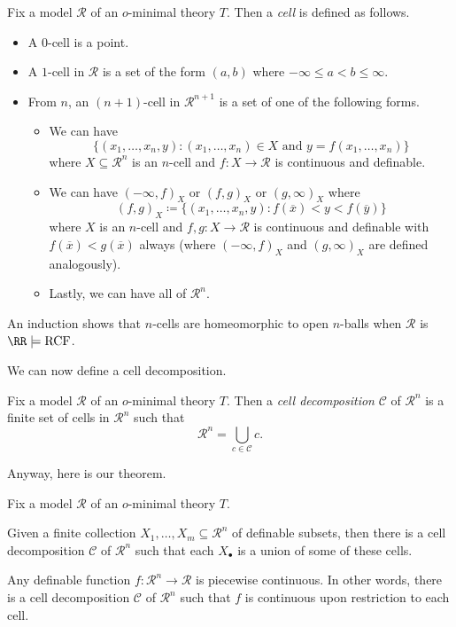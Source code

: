 \documentclass[../notes.tex]{subfiles}
\begin{document}
\begin{definition}[cell]
	Fix a model $\mathcal R$ of an $o$-minimal theory $T$. Then a \textit{cell} is defined as follows.
	\begin{itemize}
		\item A $0$-cell is a point.
		\item A $1$-cell in $\mathcal R$ is a set of the form $(a,b)$ where $-\infty\le a<b\le\infty$.
		\item From $n$, an $(n+1)$-cell in $\mathcal R^{n+1}$ is a set of one of the following forms.
		\begin{itemize}
			\item We can have
			\[\{(x_1,\ldots,x_n,y):(x_1,\ldots,x_n)\in X\text{ and }y=f(x_1,\ldots,x_n)\}\]
			where $X\subseteq\mathcal R^n$ is an $n$-cell and $f\colon X\to\mathcal R$ is continuous and definable.
			\item We can have $(-\infty,f)_X$ or $(f,g)_X$ or $(g,\infty)_X$ where
			\[(f,g)_X\coloneqq\{(x_1,\ldots,x_n,y):f(\overline x)<y<f(\overline y)\}\]
			where $X$ is an $n$-cell and $f,g\colon X\to\mathcal R$ is continuous and definable with $f(\overline x)<g(\overline x)$ always (where $(-\infty,f)_X$ and $(g,\infty)_X$ are defined analogously).
			\item Lastly, we can have all of $\mathcal R^n$.
		\end{itemize}
	\end{itemize}
\end{definition}
\begin{remark}
	An induction shows that $n$-cells are homeomorphic to open $n$-balls when $\mathcal R$ is $\RR\models\mathrm{RCF}$.
\end{remark}
We can now define a cell decomposition.
\begin{definition}
	Fix a model $\mathcal R$ of an $o$-minimal theory $T$. Then a \textit{cell decomposition} $\mathcal C$ of $\mathcal R^n$ is a finite set of cells in $\mathcal R^n$ such that
	\[\mathcal R^n=\bigcup_{c\in\mathcal C}c.\]
\end{definition}
Anyway, here is our theorem.
\begin{theorem} \label{thm:cell-decomp}
	Fix a model $\mathcal R$ of an $o$-minimal theory $T$.
	\begin{listalph}
		\item Given a finite collection $X_1,\ldots,X_m\subseteq\mathcal R^n$ of definable subsets, then there is a cell decomposition $\mathcal C$ of $\mathcal R^n$ such that each $X_\bullet$ is a union of some of these cells.
		\item Any definable function $f\colon\mathcal R^n\to\mathcal R$ is piecewise continuous. In other words, there is a cell decomposition $\mathcal C$ of $\mathcal R^n$ such that $f$ is continuous upon restriction to each cell.
	\end{listalph}
\end{theorem}
\end{document}
